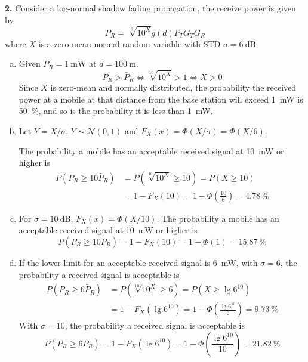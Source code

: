 \documentclass[a4paper,12pt]{article}
\newcommand{\N}{\mathcal N}
\newcommand{\problem}[1]{\noindent\textbf{#1.}}
\begin{document}
\problem 2  Consider a log-normal shadow fading propagation, the receive power
is given by \[P_R = \sqrt[10]{10^X} g(d) P_T G_T G_R\] where $X$ is a zero-mean
normal random variable with STD $\sigma = \SI{6}{\deci\bel}$.
\begin{enumerate}[(a)]
  \item Given $\bar P_R = \SI{1}{\milli\watt}$ at $d = \SI{100}{\metre}$.
    \[P_R > \bar P_R \iff \sqrt[10]{10^X} > 1 \iff X > 0\]
    Since $X$ is zero-mean and normally distributed, the probability
    the received power at a mobile at that distance from the base station
    will exceed \SI{1}{\milli\watt} is \SI{50}{\percent}, and so is the
    probability it is less than \SI{1}{\milli\watt}.

  \item Let $Y = X/\sigma$, $Y \sim \N(0, 1)$
    and $F_X(x) = \Phi(X/\sigma) = \Phi(X/6)$.

    The probability a mobile has an acceptable received signal at
    \SI{10}{\milli\watt} or higher is
    \begin{align*}
      P\left(P_R \ge 10\bar P_R\right)
      &= P\left(\sqrt[10]{10^X} \ge 10\right) = P(X \ge 10)\\
      &= 1 - F_X(10) = 1 - \Phi\left(\frac{10}{6}\right) = \SI{4.78}{\percent}
    \end{align*}

  \item For $\sigma = \SI{10}{\deci\bel}$, $F_X(x) = \Phi(X/10)$.
    The probability a mobile has an acceptable received signal at
    \SI{10}{\milli\watt} or higher is
    \[P\left(P_R \ge 10\bar P_R\right) = 1 - F_X(10)
    = 1 - \Phi(1) = \SI{15.87}{\percent}\]

  \item If the lower limit for an acceptable received signal is
    \SI{6}{\milli\watt}, with $\sigma = 6$, the probability a received signal
    is acceptable is
    \begin{align*}
      P\left(P_R \ge 6\bar P_R\right)
      &= P\left(\sqrt[10]{10^X} \ge 6\right)
       = P\left(X \ge \lg{6^{10}}\right)\\
      &= 1 - F_X\left(\lg{6^{10}}\right)
       = 1 - \Phi\left(\frac{\lg{6^{10}}}{6}\right) = \SI{9.73}{\percent}
    \end{align*}
    With $\sigma = 10$, the probability a received signal is acceptable is
    \[P\left(P_R \ge 6\bar P_R\right) = 1 - F_X\left(\lg{6^{10}}\right)
      = 1 - \Phi\left(\frac{\lg{6^{10}}}{10}\right) = \SI{21.82}{\percent}\]
\end{enumerate}
\end{document}
